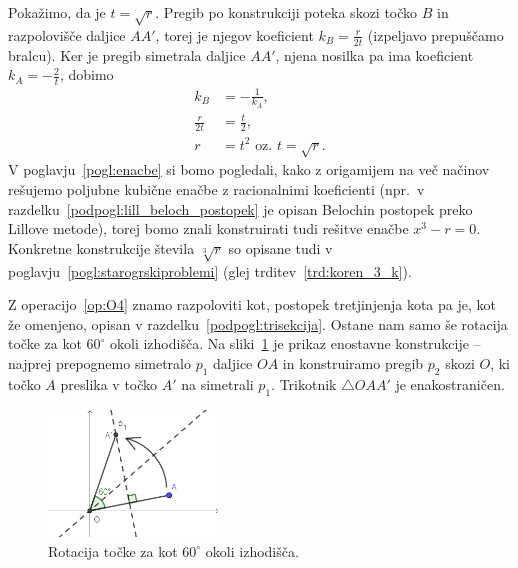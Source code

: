 \begin{dokaz}
    Pokažimo, da je $t = \sqrt{r}$. Pregib po konstrukciji poteka skozi točko $B$ in razpolovišče daljice $AA'$, torej je njegov koeficient $k_B = \frac{r}{2t}$ (izpeljavo prepuščamo bralcu). Ker je pregib simetrala daljice $AA'$, njena nosilka pa ima koeficient $k_A = - \frac{2}{t}$, dobimo
    \begin{align*}
        k_B &= - \frac{1}{k_A},\\
        \frac{r}{2t} &= \frac{t}{2},\\
        r &= t^2 \text{ oz. } t = \sqrt{r}.
    \end{align*}    
    V poglavju~\ref{pogl:enacbe} si bomo pogledali, kako z origamijem na več načinov rešujemo poljubne kubične enačbe z racionalnimi koeficienti (npr.\ v razdelku~\ref{podpogl:lill_beloch_postopek} je opisan Belochin postopek preko Lillove metode), torej bomo znali konstruirati tudi rešitve enačbe $x^3 - r = 0$. Konkretne konstrukcije števila $\sqrt[3]{r}$ so opisane tudi v poglavju~\ref{pogl:starogrskiproblemi} (glej trditev~\ref{trd:koren_3_k}).
    
    Z operacijo~\ref{op:O4} znamo razpoloviti kot, postopek tretjinjenja kota pa je, kot že omenjeno, opisan v razdelku~\ref{podpogl:trisekcija}. Ostane nam samo še rotacija točke za kot $60^\circ$ okoli izhodišča. Na sliki~\ref{fig:kot60_rotacija} je prikaz enostavne konstrukcije -- najprej prepognemo simetralo $p_1$ daljice $OA$ in konstruiramo pregib $p_2$ skozi $O$, ki točko $A$ preslika v točko $A'$ na simetrali $p_1$. Trikotnik $\triangle OAA'$ je enakostraničen. 
    \begin{figure}[h]
        \centering
        \includegraphics[width=0.4\textwidth]{images/algebra/kot60.png}
        \caption[Rotacija točke okoli izhodišča]{Rotacija točke za kot $60^\circ$ okoli izhodišča.}
        \label{fig:kot60_rotacija}
    \end{figure}
\end{dokaz}

